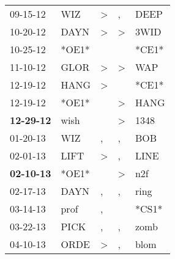 \begin{supertabular}{p{0.07\textwidth}p{0.06\textwidth}p{0.02\textwidth}p{0.02\textwidth}p{0.06\textwidth}}
          09-15-12\textsuperscript{} &            WIZ\textsuperscript{} &     \textgreater &                , &           DEEP\textsuperscript{} \\
          10-20-12\textsuperscript{} &           DAYN\textsuperscript{} &     \textgreater &     \textgreater &           3WID\textsuperscript{} \\
          10-25-12\textsuperscript{} &                            *OE1* &                  &                  &                            *CE1* \\
          11-10-12\textsuperscript{} &           GLOR\textsuperscript{} &     \textgreater &     \textgreater &            WAP\textsuperscript{} \\
          12-19-12\textsuperscript{} &           HANG\textsuperscript{} &     \textgreater &                  &                            *CE1* \\
          12-19-12\textsuperscript{} &                            *OE1* &                  &     \textgreater &           HANG\textsuperscript{} \\
 \textbf{12-29-12\textsuperscript{}} &           wish\textsuperscript{} &                  &     \textgreater &           1348\textsuperscript{} \\
          01-20-13\textsuperscript{} &            WIZ\textsuperscript{} &                , &                , &            BOB\textsuperscript{} \\
          02-01-13\textsuperscript{} &           LIFT\textsuperscript{} &     \textgreater &                , &           LINE\textsuperscript{} \\
 \textbf{02-10-13\textsuperscript{}} &                            *OE1* &                  &     \textgreater &            n2f\textsuperscript{} \\
          02-17-13\textsuperscript{} &           DAYN\textsuperscript{} &                , &                , &           ring\textsuperscript{} \\
          03-14-13\textsuperscript{} &           prof\textsuperscript{} &                , &                  &                            *CS1* \\
          03-22-13\textsuperscript{} &           PICK\textsuperscript{} &                , &                , &           zomb\textsuperscript{} \\
          04-10-13\textsuperscript{} &           ORDE\textsuperscript{} &     \textgreater &                , &           blom\textsuperscript{} \\

\end{supertabular}
